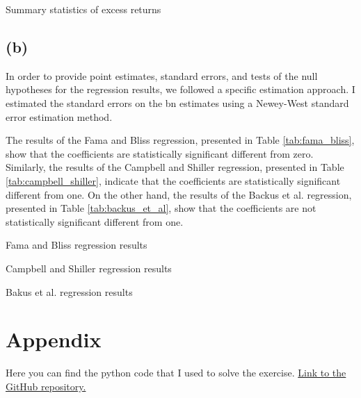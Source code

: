\documentclass[hidelinks,12pt]{article}
\begin{document}
\begin{table}[htbp]
\centering
\caption{Summary statistics of excess returns}
\label{tab:excess_return_describe}
\resizebox{!}{!}{}
\end{table}

\FloatBarrier

\subsection*{(b)}

In order to provide point estimates, standard errors, and tests of the null hypotheses for the regression results, we followed a specific estimation approach. I estimated the standard errors on the bn estimates using a Newey-West standard error estimation method.

The results of the Fama and Bliss regression, presented in Table \ref{tab:fama_bliss}, show that the coefficients are statistically significant different from zero.
Similarly, the results of the Campbell and Shiller regression, presented in Table \ref{tab:campbell_shiller}, indicate that the coefficients are statistically significant different from one. 
On the other hand, the results of the Backus et al. regression, presented in Table \ref{tab:backus_et_al}, show that the coefficients are not statistically significant different from one. 


\begin{table}[htbp]
\centering
\caption{Fama and Bliss regression results}
\label{tab:fama_bliss}
\resizebox{!}{!}{}
\end{table}


\begin{table}[htbp]
    \centering
    \caption{Campbell and Shiller regression results}
    \label{tab:campbell_shiller}
    \resizebox{!}{!}{}
    \end{table}



\begin{table}[htbp]
    \centering
    \caption{Bakus et al. regression results}
    \label{tab:backus_et_al}
    \resizebox{!}{!}{}
    \end{table}


\appendix

\section*{Appendix}

Here you can find the python code that I used to solve the exercise. \href{https://github.com/mortezaaghajanzadeh/BDAP/tree/main/Assignments/Assignment4}{Link to the GitHub repository.}
\end{document}
